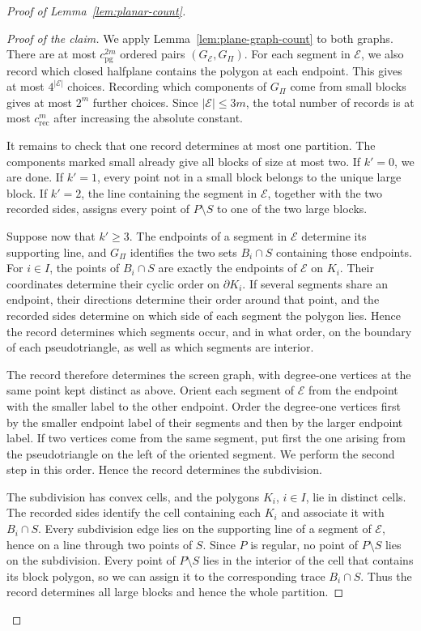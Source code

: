 \documentclass[11pt]{article}
\theoremstyle{definition}
\newenvironment{poc}{\begin{proof}[Proof of the claim]\renewcommand*{\qedsymbol}{\(\blacksquare\)}}{\end{proof}}
\newcommand*{\abs}[1]{\lvert#1\rvert}
\begin{document}
\begin{proof}[Proof of Lemma~\ref{lem:planar-count}]
\begin{poc}
We apply Lemma~\ref{lem:plane-graph-count} to both graphs. There are at most \(c_{\mathrm{pg}}^{2m}\) ordered pairs \((G_{\mathcal{E}},G_{\Pi})\). For each segment in \(\mathcal{E}\), we also record which closed halfplane contains the polygon at each endpoint. This gives at most \(4^{\abs{\mathcal{E}}}\) choices. Recording which components of \(G_{\Pi}\) come from small blocks gives at most \(2^{m}\) further choices. Since \(\abs{\mathcal{E}}\le3m\), the total number of records is at most \(c_{\mathrm{rec}}^{m}\) after increasing the absolute constant.

It remains to check that one record determines at most one partition. The components marked small already give all blocks of size at most two. If \(k'=0\), we are done. If \(k'=1\), every point not in a small block belongs to the unique large block. If \(k'=2\), the line containing the segment in \(\mathcal{E}\), together with the two recorded sides, assigns every point of \(P\setminus S\) to one of the two large blocks.

Suppose now that \(k'\ge3\). The endpoints of a segment in \(\mathcal{E}\) determine its supporting line, and \(G_{\Pi}\) identifies the two sets \(B_{i}\cap S\) containing those endpoints. For \(i\in I\), the points of \(B_i\cap S\) are exactly the endpoints of \(\mathcal{E}\) on \(K_i\). Their coordinates determine their cyclic order on \(\partial K_i\). If several segments share an endpoint, their directions determine their order around that point, and the recorded sides determine on which side of each segment the polygon lies. Hence the record determines which segments occur, and in what order, on the boundary of each pseudotriangle, as well as which segments are interior.

The record therefore determines the screen graph, with degree-one vertices at the same point kept distinct as above. Orient each segment of \(\mathcal{E}\) from the endpoint with the smaller label to the other endpoint. Order the degree-one vertices first by the smaller endpoint label of their segments and then by the larger endpoint label. If two vertices come from the same segment, put first the one arising from the pseudotriangle on the left of the oriented segment. We perform the second step in this order. Hence the record determines the subdivision.

The subdivision has convex cells, and the polygons \(K_{i}\), \(i\in I\), lie in distinct cells. The recorded sides identify the cell containing each \(K_i\) and associate it with \(B_i\cap S\). Every subdivision edge lies on the supporting line of a segment of \(\mathcal{E}\), hence on a line through two points of \(S\). Since \(P\) is regular, no point of \(P\setminus S\) lies on the subdivision. Every point of \(P\setminus S\) lies in the interior of the cell that contains its block polygon, so we can assign it to the corresponding trace \(B_{i}\cap S\). Thus the record determines all large blocks and hence the whole partition.
\end{poc}


\end{proof}
\end{document}
